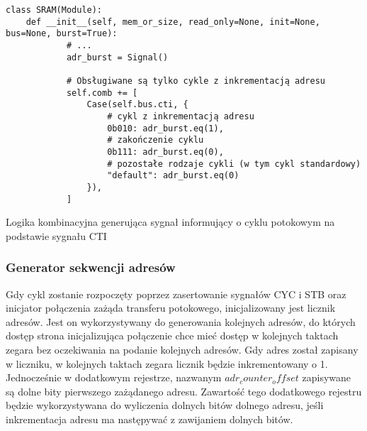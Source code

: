 \begin{listing}[H]
\begin{verbatim}
class SRAM(Module):
    def __init__(self, mem_or_size, read_only=None, init=None, bus=None, burst=True):
            # ...
            adr_burst = Signal()

            # Obsługiwane są tylko cykle z inkrementacją adresu
            self.comb += [
                Case(self.bus.cti, {
                    # cykl z inkrementacją adresu
                    0b010: adr_burst.eq(1),
                    # zakończenie cyklu
                    0b111: adr_burst.eq(0),
                    # pozostałe rodzaje cykli (w tym cykl standardowy)
                    "default": adr_burst.eq(0)
                }),
            ]
\end{verbatim}
\caption{\label{lst:impl-sram-detect}Logika kombinacyjna generująca sygnał informujący o cyklu potokowym na podstawie sygnału CTI}
\end{listing}

\subsubsection{Generator sekwencji adresów}

Gdy cykl zostanie rozpoczęty poprzez zasertowanie sygnałów CYC i STB oraz inicjator połączenia zażąda transferu potokowego, inicjalizowany jest licznik adresów. Jest on wykorzystywany do generowania kolejnych adresów, do których dostęp strona inicjalizująca połączenie chce mieć dostęp w kolejnych taktach zegara bez oczekiwania na podanie kolejnych adresów. Gdy adres został zapisany w liczniku, w kolejnych taktach zegara licznik będzie inkrementowany o 1.
Jednocześnie w dodatkowym rejestrze, nazwanym $adr_counter_offset$ zapisywane są dolne bity pierwszego zażądanego adresu. Zawartość tego dodatkowego rejestru będzie wykorzystywana do wyliczenia dolnych bitów dolnego adresu, jeśli inkrementacja adresu ma następywać z zawijaniem dolnych bitów.


